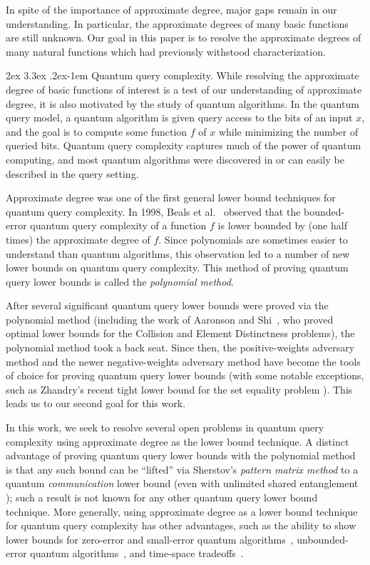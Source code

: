 \documentclass[11pt, letterpaper, fleqn]{article}
\makeatletter
\newcommand{\para}{
  \@startsection{paragraph}{4}
  {\z@}{2ex \@plus 3.3ex \@minus .2ex}{-1em}
  {\normalfont\normalsize\bfseries}
}
\theoremstyle{plain}
\makeatother
\begin{document}
In spite of the importance of approximate degree, major gaps remain in our understanding. In particular, the approximate degrees of many basic functions are still unknown. Our goal in this paper is to resolve the approximate degrees of many natural functions which had previously withstood characterization.

\para{Quantum query complexity.}
While resolving the approximate degree of basic functions of interest is a test of our understanding of approximate degree, it is also motivated by the study of quantum algorithms.
In the quantum query model, a quantum algorithm is given query access to the bits of an input $x$, and the goal is to compute some function $f$ of $x$ while minimizing the number of queried bits. Quantum query complexity captures much of the power of quantum computing, and most quantum algorithms were discovered in or can easily be described in the query setting. 

Approximate degree was one of the first general lower bound techniques for quantum query complexity. 
In 1998, Beals et al.~\cite{beals} observed that the bounded-error quantum query complexity of a function $f$ is lower bounded by (one half times) the approximate degree of $f$.
Since polynomials are sometimes easier to understand than quantum algorithms, this observation led to a number of new lower bounds on quantum query complexity. 
This method of proving quantum query lower bounds is called the \emph{polynomial method}. 

After several significant quantum query lower bounds were proved via the polynomial method (including the work of Aaronson and Shi~\cite{aaronsonshi}, who proved  optimal lower bounds for the Collision and Element Distinctness problems), the polynomial method took a back seat. Since then, the positive-weights adversary method \cite{Amb02,BSS03,LM04,Zha05} and the newer negative-weights adversary method \cite{negativeweights,adversary2,LMR+11} have become the tools of choice for proving quantum query lower bounds (with some notable exceptions, such as Zhandry's recent tight lower bound for the set equality problem \cite{perm1}). This leads us to our second goal for this work.

In this work, we seek to resolve several open problems in quantum query complexity using approximate degree as the lower bound technique.
A distinct advantage of proving quantum query lower bounds with the polynomial method is that any such bound can be ``lifted'' via Sherstov's \emph{pattern matrix method} \cite{patmat} to a quantum \emph{communication} lower bound (even with unlimited shared entanglement \cite{ls09rank}); such a result is not known for any other quantum query lower bound technique. More generally, using approximate degree as a lower bound technique for quantum query complexity has other advantages, such as the ability to show lower bounds for zero-error and small-error quantum algorithms~\cite{smallerrorquantum}, unbounded-error quantum algorithms~\cite{beals}, and time-space tradeoffs~\cite{KSdW07}.
\end{document}
